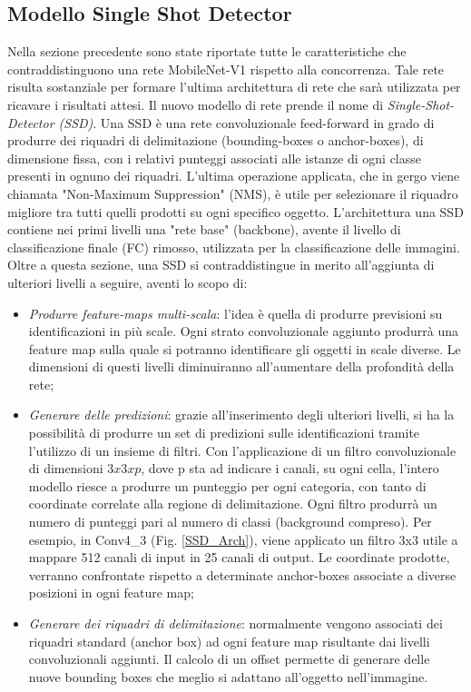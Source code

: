 \subsection{Modello Single Shot Detector}
Nella sezione precedente sono state riportate tutte le caratteristiche che contraddistinguono una rete MobileNet-V1 rispetto alla concorrenza. Tale rete risulta sostanziale per formare l'ultima architettura di rete che sarà utilizzata per ricavare i risultati attesi. Il nuovo modello di rete prende il nome di \emph{Single-Shot-Detector (SSD)}.
Una SSD è una rete convoluzionale feed-forward in grado di produrre dei riquadri di delimitazione (bounding-boxes o anchor-boxes), di dimensione fissa, con i relativi punteggi associati alle istanze di ogni classe presenti in ognuno dei riquadri. L'ultima operazione applicata, che in gergo viene chiamata "Non-Maximum Suppression" (NMS), è utile per selezionare il riquadro migliore tra tutti quelli prodotti su ogni specifico oggetto. 
L'architettura una SSD contiene nei primi livelli una "rete base" (backbone), avente il livello di classificazione finale (FC) rimosso, utilizzata per la classificazione delle immagini. Oltre a questa sezione, una SSD si contraddistingue in merito all'aggiunta di ulteriori livelli a seguire, aventi lo scopo di:
\begin{itemize}
    \item \emph{Produrre feature-maps multi-scala}: l'idea è quella di produrre previsioni su identificazioni in più scale. Ogni strato convoluzionale aggiunto produrrà una feature map sulla quale si potranno identificare gli oggetti in scale diverse. Le dimensioni di questi livelli diminuiranno all'aumentare della profondità della rete;
    \item \emph{Generare delle predizioni}: grazie all'inserimento degli ulteriori livelli, si ha la possibilità di produrre un set di predizioni sulle identificazioni tramite l'utilizzo di un insieme di filtri. Con l'applicazione di un filtro convoluzionale di dimensioni $3x3xp$, dove p sta ad indicare i canali, su ogni cella, l'intero modello riesce a produrre un punteggio per ogni categoria, con tanto di coordinate correlate alla regione di delimitazione. Ogni filtro produrrà un numero di punteggi pari al numero di classi (background compreso). Per esempio, in Conv4\_3 (Fig. \ref{SSD_Arch}), viene applicato un filtro 3x3 utile a mappare 512 canali di input in 25 canali di output. Le coordinate prodotte, verranno confrontate rispetto a determinate anchor-boxes associate a diverse posizioni in ogni feature map;
    \item \emph{Generare dei riquadri di delimitazione}: normalmente vengono associati dei riquadri standard (anchor box) ad ogni feature map risultante dai livelli convoluzionali aggiunti. Il calcolo di un offset permette di generare delle nuove bounding boxes che meglio si adattano all'oggetto nell'immagine. 
\end{itemize}
